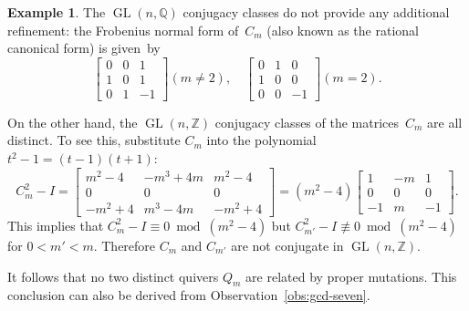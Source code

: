 \documentclass[11pt, letterpaper]{amsart}
\theoremstyle{definition}
\newtheorem{example}[theorem]{Example}
\numberwithin{equation}{section}
\def\GL{{\operatorname{GL}}}
\begin{document}
\begin{example}

The $\GL(n,\mathbb{Q})$ conjugacy classes do not provide any additional refinement: 
the Frobenius normal form of~$C_m$ (also known as the rational canonical form) is given~by
\begin{equation*}
\begin{bmatrix}
0 & 0 & 1 \\
1 & 0 & 1 \\
0 & 1 & -1
\end{bmatrix}
(m\neq 2), 
\quad
\begin{bmatrix}
0 & 1 & 0 \\
1 & 0 & 0 \\
0 & 0 & -1
\end{bmatrix}
(m= 2). 
\end{equation*}

On the other hand, the $\GL(n,\mathbb{Z})$ conjugacy classes of the matrices~$C_m$ are all distinct. 
To see this, substitute $C_m$ into the polynomial $t^2-1=(t-1)(t+1)$: 
\begin{equation*}
C_m^2-I
= \begin{bmatrix}
m^2 - 4 & -m^3 + 4m & m^2 - 4 \\
0 & 0 & 0 \\
-m^2 + 4 & m^3 - 4m & -m^2 + 4
\end{bmatrix}
=(m^2-4)
\begin{bmatrix}
1 & -m & 1 \\
0 & 0 & 0 \\
-1 & m & -1
\end{bmatrix}
.
\end{equation*}
This implies that $C_m^2-I\equiv 0 \bmod (m^2-4)$ but $C_{m'}^2-I\not\equiv 0 \bmod (m^2-4)$ for $0<m'<m$. 
Therefore $C_m$ and $C_{m'}$ are not conjugate in $\GL(n,\mathbb{Z})$. 


It follows that no two distinct quivers $Q_m$ are related by proper mutations. 
This conclusion can also be derived from Observation~\ref{obs:gcd-seven}. %

\end{example}
\end{document}
